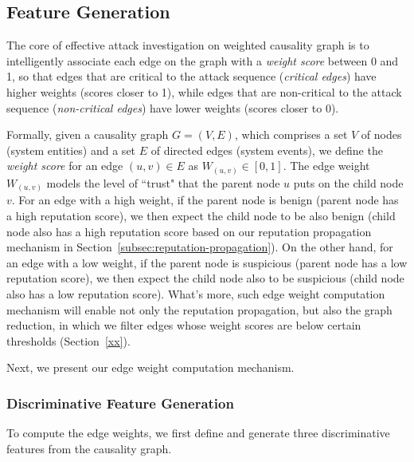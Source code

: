 \subsection{Feature Generation}
\label{subsec:feature-generation}

The core of effective attack investigation on weighted causality graph is to intelligently associate each edge on the graph with a \emph{weight score} between 0 and 1, so that edges that are critical to the attack sequence (\ie \emph{critical edges}) have higher weights (\ie scores closer to 1), while edges that are non-critical to the attack sequence (\ie \emph{non-critical edges}) have lower weights (\ie scores closer to 0).

Formally, given a causality graph $G = (V, E)$, which comprises a set $V$ of nodes (\ie system entities) and a set $E$ of directed edges (\ie system events), we define the \emph{weight score} for an edge $(u, v) \in E$ as $W_{(u, v)} \in [0, 1]$.
%
The edge weight $W_{(u, v)}$ models the level of ``trust" that the parent node $u$ puts on the child node $v$. 
%
For an edge with a high weight, if the parent node is benign (\ie parent node has a high reputation score), we then expect the child node to be also benign (\ie child node also has a high reputation score based on our reputation propagation mechanism in Section~\ref{subsec:reputation-propagation}). 
On the other hand, for an edge with a low weight, if the parent node is suspicious (\ie parent node has a low reputation score), we then expect the child node also to be suspicious (\ie child node also has a low reputation score). 
What's more, such edge weight computation mechanism will enable not only the reputation propagation, but also the graph reduction, in which we filter edges whose weight scores are below certain thresholds (Section~\ref{xx}).

Next, we present our edge weight computation mechanism.

\subsubsection{Discriminative Feature Generation}
\label{subsubsec:feature-generation}
To compute the edge weights, we first define and generate three discriminative features from the causality graph. 

